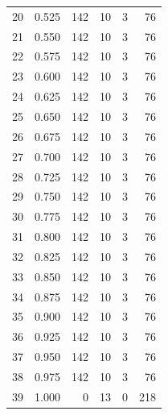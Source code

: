 \documentclass[a4paper,twoside,12pt]{book}
\begin{document}
\begin{appendices}
\begin{table}
\begin{tabular}{lrrrrr}
		20 &  0.525 &       142 &        10 &               3 &              76 \\
		21 &  0.550 &       142 &        10 &               3 &              76 \\
		22 &  0.575 &       142 &        10 &               3 &              76 \\
		23 &  0.600 &       142 &        10 &               3 &              76 \\
		24 &  0.625 &       142 &        10 &               3 &              76 \\
		25 &  0.650 &       142 &        10 &               3 &              76 \\
		26 &  0.675 &       142 &        10 &               3 &              76 \\
		27 &  0.700 &       142 &        10 &               3 &              76 \\
		28 &  0.725 &       142 &        10 &               3 &              76 \\
		29 &  0.750 &       142 &        10 &               3 &              76 \\
		30 &  0.775 &       142 &        10 &               3 &              76 \\
		31 &  0.800 &       142 &        10 &               3 &              76 \\
		32 &  0.825 &       142 &        10 &               3 &              76 \\
		33 &  0.850 &       142 &        10 &               3 &              76 \\
		34 &  0.875 &       142 &        10 &               3 &              76 \\
		35 &  0.900 &       142 &        10 &               3 &              76 \\
		36 &  0.925 &       142 &        10 &               3 &              76 \\
		37 &  0.950 &       142 &        10 &               3 &              76 \\
		38 &  0.975 &       142 &        10 &               3 &              76 \\
		39 &  1.000 &         0 &        13 &               0 &             218 \\
		\bottomrule
	\end{tabular}
\end{table}


\end{appendices}
\end{document}

